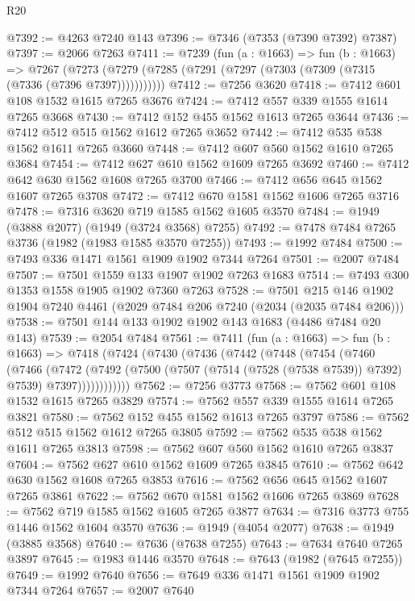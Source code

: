 \begin{lexlean}{R20}
\begin{coremodule}
@7392 := @4263 @7240 @143
@7396 := @7346 (@7353 (@7390 @7392) @7387)
@7397 := @2066 @7263
@7411 := @7239
    (fun (a : @1663) =>
    fun (b : @1663) =>
    @7267 (@7273 (@7279 (@7285 (@7291 (@7297 (@7303 (@7309 (@7315 (@7336 (@7396 @7397)))))))))))
@7412 := @7256 @3620
@7418 := @7412 @601 @108 @1532 @1615 @7265 @3676
@7424 := @7412 @557 @339 @1555 @1614 @7265 @3668
@7430 := @7412 @152 @455 @1562 @1613 @7265 @3644
@7436 := @7412 @512 @515 @1562 @1612 @7265 @3652
@7442 := @7412 @535 @538 @1562 @1611 @7265 @3660
@7448 := @7412 @607 @560 @1562 @1610 @7265 @3684
@7454 := @7412 @627 @610 @1562 @1609 @7265 @3692
@7460 := @7412 @642 @630 @1562 @1608 @7265 @3700
@7466 := @7412 @656 @645 @1562 @1607 @7265 @3708
@7472 := @7412 @670 @1581 @1562 @1606 @7265 @3716
@7478 := @7316 @3620 @719 @1585 @1562 @1605 @3570
@7484 := @1949 (@3888 @2077) (@1949 (@3724 @3568) @7255)
@7492 := @7478 @7484 @7265 @3736 (@1982 (@1983 @1585 @3570 @7255))
@7493 := @1992 @7484
@7500 := @7493 @336 @1471 @1561 @1909 @1902 @7344 @7264
@7501 := @2007 @7484
@7507 := @7501 @1559 @133 @1907 @1902 @7263 @1683
@7514 := @7493 @300 @1353 @1558 @1905 @1902 @7360 @7263
@7528 := @7501 @215 @146 @1902 @1904 @7240 @4461 (@2029 @7484 @206 @7240 (@2034 (@2035 @7484 @206)))
@7538 := @7501 @144 @133 @1902 @1902 @143 @1683 (@4486 @7484 @20 @143)
@7539 := @2054 @7484
@7561 := @7411
    (fun (a : @1663) =>
    fun (b : @1663) =>
    @7418
      (@7424
        (@7430
          (@7436
            (@7442
              (@7448
                (@7454
                  (@7460
                    (@7466
                      (@7472
                        (@7492
                          (@7500 (@7507 (@7514 (@7528 (@7538 @7539)) @7392) @7539) @7397))))))))))))
@7562 := @7256 @3773
@7568 := @7562 @601 @108 @1532 @1615 @7265 @3829
@7574 := @7562 @557 @339 @1555 @1614 @7265 @3821
@7580 := @7562 @152 @455 @1562 @1613 @7265 @3797
@7586 := @7562 @512 @515 @1562 @1612 @7265 @3805
@7592 := @7562 @535 @538 @1562 @1611 @7265 @3813
@7598 := @7562 @607 @560 @1562 @1610 @7265 @3837
@7604 := @7562 @627 @610 @1562 @1609 @7265 @3845
@7610 := @7562 @642 @630 @1562 @1608 @7265 @3853
@7616 := @7562 @656 @645 @1562 @1607 @7265 @3861
@7622 := @7562 @670 @1581 @1562 @1606 @7265 @3869
@7628 := @7562 @719 @1585 @1562 @1605 @7265 @3877
@7634 := @7316 @3773 @755 @1446 @1562 @1604 @3570
@7636 := @1949 (@4054 @2077)
@7638 := @1949 (@3885 @3568)
@7640 := @7636 (@7638 @7255)
@7643 := @7634 @7640 @7265 @3897
@7645 := @1983 @1446 @3570
@7648 := @7643 (@1982 (@7645 @7255))
@7649 := @1992 @7640
@7656 := @7649 @336 @1471 @1561 @1909 @1902 @7344 @7264
@7657 := @2007 @7640

\end{coremodule}
\end{lexlean}
